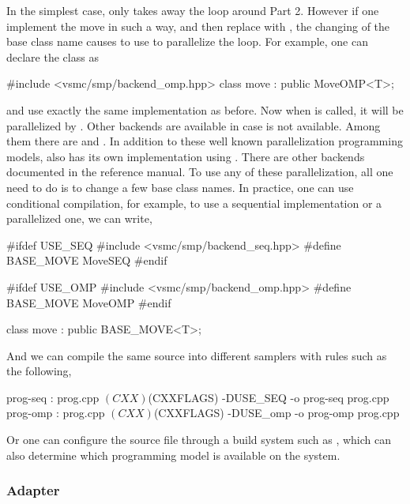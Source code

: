 In the simplest case,  only takes away the loop around Part 2.
However if one implement the move in such a way, and then replace
 with , the changing of the base class name causes
\vsmc to use \openmp to parallelize the loop. For example, one can declare the
class as
\begin{cppcode}
#include <vsmc/smp/backend_omp.hpp>
class move : public MoveOMP<T>;
\end{cppcode}
and use exactly the same implementation as before. Now when
 is called, it will be parallelized by \openmp. Other
backends are available in case \openmp is not available. Among them there are
\cilk and \tbb. In addition to these well known parallelization programming
models, \vsmc also has its own implementation using \cppoo{} .
There are other backends documented in the reference manual. To use any of
these parallelization, all one need to do is to change a few base class names.
In practice, one can use conditional compilation, for example, to use a
sequential implementation or a \openmp parallelized one, we can write,
\begin{cppcode}
#ifdef USE_SEQ
#include <vsmc/smp/backend_seq.hpp>
#define BASE_MOVE MoveSEQ
#endif

#ifdef USE_OMP
#include <vsmc/smp/backend_omp.hpp>
#define BASE_MOVE MoveOMP
#endif

class move : public BASE_MOVE<T>;
\end{cppcode}
And we can compile the same source into different samplers with
 rules such as the following,
\begin{cppcode}
prog-seq : prog.cpp
        $(CXX) $(CXXFLAGS) -DUSE_SEQ -o prog-seq prog.cpp
prog-omp : prog.cpp
        $(CXX) $(CXXFLAGS) -DUSE_omp -o prog-omp prog.cpp
\end{cppcode}
Or one can configure the source file through a build system such as \cmake,
which can also determine which programming model is available on the system.

\subsubsection{Adapter}

